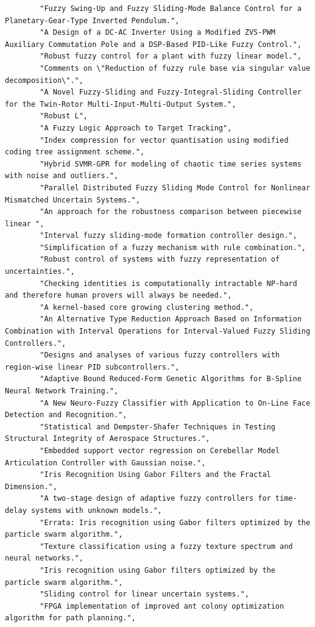 \begin{verbatim}
        "Fuzzy Swing-Up and Fuzzy Sliding-Mode Balance Control for a Planetary-Gear-Type Inverted Pendulum.", 
        "A Design of a DC-AC Inverter Using a Modified ZVS-PWM Auxiliary Commutation Pole and a DSP-Based PID-Like Fuzzy Control.", 
        "Robust fuzzy control for a plant with fuzzy linear model.", 
        "Comments on \"Reduction of fuzzy rule base via singular value decomposition\".", 
        "A Novel Fuzzy-Sliding and Fuzzy-Integral-Sliding Controller for the Twin-Rotor Multi-Input-Multi-Output System.", 
        "Robust L", 
        "A Fuzzy Logic Approach to Target Tracking", 
        "Index compression for vector quantisation using modified coding tree assignment scheme.", 
        "Hybrid SVMR-GPR for modeling of chaotic time series systems with noise and outliers.", 
        "Parallel Distributed Fuzzy Sliding Mode Control for Nonlinear Mismatched Uncertain Systems.", 
        "An approach for the robustness comparison between piecewise linear ", 
        "Interval fuzzy sliding-mode formation controller design.", 
        "Simplification of a fuzzy mechanism with rule combination.", 
        "Robust control of systems with fuzzy representation of uncertainties.", 
        "Checking identities is computationally intractable NP-hard and therefore human provers will always be needed.", 
        "A kernel-based core growing clustering method.", 
        "An Alternative Type Reduction Approach Based on Information Combination with Interval Operations for Interval-Valued Fuzzy Sliding Controllers.", 
        "Designs and analyses of various fuzzy controllers with region-wise linear PID subcontrollers.", 
        "Adaptive Bound Reduced-Form Genetic Algorithms for B-Spline Neural Network Training.", 
        "A New Neuro-Fuzzy Classifier with Application to On-Line Face Detection and Recognition.", 
        "Statistical and Dempster-Shafer Techniques in Testing Structural Integrity of Aerospace Structures.", 
        "Embedded support vector regression on Cerebellar Model Articulation Controller with Gaussian noise.", 
        "Iris Recognition Using Gabor Filters and the Fractal Dimension.", 
        "A two-stage design of adaptive fuzzy controllers for time-delay systems with unknown models.", 
        "Errata: Iris recognition using Gabor filters optimized by the particle swarm algorithm.", 
        "Texture classification using a fuzzy texture spectrum and neural networks.", 
        "Iris recognition using Gabor filters optimized by the particle swarm algorithm.", 
        "Sliding control for linear uncertain systems.", 
        "FPGA implementation of improved ant colony optimization algorithm for path planning.", 

\end{verbatim}
